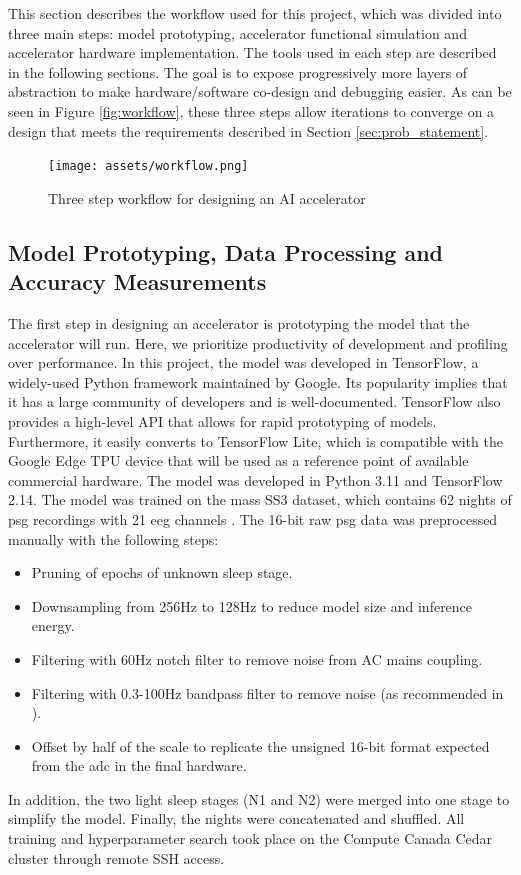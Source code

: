 This section describes the workflow used for this project, which was divided into three main steps: model prototyping, accelerator functional simulation and accelerator hardware implementation.
The tools used in each step are described in the following sections. The goal is to expose progressively more layers of abstraction to make hardware/software co-design and debugging easier. As
can be seen in Figure \ref{fig:workflow}, these three steps allow iterations to converge on a design that meets the requirements described in Section \ref{sec:prob_statement}.
\begin{figure}[H]
    \centering
    \caption{Three step workflow for designing an AI accelerator}
    \texttt{[image: assets/workflow.png]}
\end{figure}
\label{fig:workflow}

\subsection{Model Prototyping, Data Processing and Accuracy Measurements}
The first step in designing an accelerator is prototyping the model that the accelerator will run. Here, we prioritize productivity of development and profiling over performance. In this project,
the model was developed in TensorFlow, a widely-used Python framework maintained by Google. Its popularity implies that it has a large community of developers and is well-documented. TensorFlow
also provides a high-level API that allows for rapid prototyping of models. Furthermore, it easily converts to TensorFlow Lite, which is compatible with the Google Edge TPU device that will be used
as a reference point of available commercial hardware. The model was developed in Python 3.11 and TensorFlow 2.14. The model was trained on the \ac{mass} SS3 dataset, which contains 62 nights of
\ac{psg} recordings with 21 \ac{eeg} channels \cite*{SP3/9MYUCS_2022}. The 16-bit raw \ac{psg} data was preprocessed manually with the following steps:
\begin{itemize}
    \item Pruning of epochs of unknown sleep stage.
    \item Downsampling from 256Hz to 128Hz to reduce model size and inference energy.
    \item Filtering with 60Hz notch filter to remove noise from AC mains coupling.
    \item Filtering with 0.3-100Hz bandpass filter to remove noise (as recommended in \cite{supratak2017deepsleepnet}).
    \item Offset by half of the scale to replicate the unsigned 16-bit format expected from the \ac{adc} in the final hardware.
\end{itemize}
In addition, the two light sleep stages (N1 and N2) were merged into one stage to simplify the model. Finally, the nights were concatenated and shuffled.
All training and hyperparameter search took place on the Compute Canada Cedar cluster through remote SSH access.

